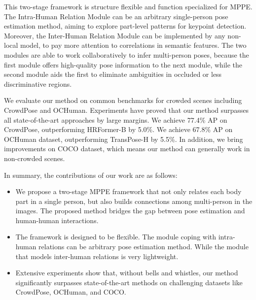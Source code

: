 \documentclass{article}
\begin{document}
This two-stage framework is structure flexible and function specialized for MPPE. The Intra-Human Relation Module can be an arbitrary single-person pose estimation method, aiming to explore part-level patterns for keypoint detection. Moreover, the Inter-Human Relation Module can be implemented by any non-local model, to pay more attention to correlations in semantic features. The two modules are able to work collaboratively to infer multi-person poses, because the first module offers high-quality pose information to the next module, while the second module aids the first to eliminate ambiguities in occluded or less discriminative regions.







We evaluate our method on common benchmarks for crowded scenes including CrowdPose and OCHuman. Experiments have proved that our method surpasses all state-of-the-art approaches by large margins. We achieve 77.4\% AP on CrowdPose, outperforming HRFormer-B by 5.0\%. We achieve 67.8\% AP on OCHuman dataset, outperforming TransPose-H by 5.5\%. 
In addition, we bring improvements on COCO dataset, which means our method can generally work in non-crowded scenes. 

In summary, the contributions of our work are as follows:

\begin{itemize}










\item We propose a two-stage MPPE framework that not only relates each body part in a single person, but also builds connections among multi-person in the images. The proposed method bridges the gap between pose estimation and human-human interactions.

\item The framework is designed to be flexible. The module coping with intra-human relations can be arbitrary pose estimation method. While the module that models inter-human relations is very lightweight.

\item Extensive experiments show that, without bells and whistles, our method significantly surpasses state-of-the-art methods on challenging datasets like CrowdPose, OCHuman, and COCO.
\end{itemize}
\end{document}
